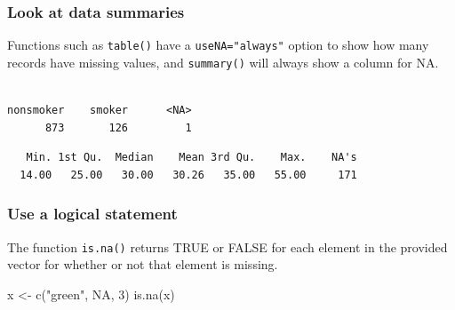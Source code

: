 \documentclass[
  letterpaper,
  DIV=11,
  numbers=noendperiod,
  oneside]{scrreprt}
\newenvironment{Shaded}{\begin{snugshade}}{\end{snugshade}}
\newcommand{\AttributeTok}[1]{\textcolor[rgb]{0.40,0.45,0.13}{#1}}
\newcommand{\ConstantTok}[1]{\textcolor[rgb]{0.56,0.35,0.01}{#1}}
\newcommand{\DecValTok}[1]{\textcolor[rgb]{0.68,0.00,0.00}{#1}}
\newcommand{\FunctionTok}[1]{\textcolor[rgb]{0.28,0.35,0.67}{#1}}
\newcommand{\NormalTok}[1]{\textcolor[rgb]{0.00,0.23,0.31}{#1}}
\newcommand{\OtherTok}[1]{\textcolor[rgb]{0.00,0.23,0.31}{#1}}
\newcommand{\SpecialCharTok}[1]{\textcolor[rgb]{0.37,0.37,0.37}{#1}}
\newcommand{\StringTok}[1]{\textcolor[rgb]{0.13,0.47,0.30}{#1}}
\begin{document}
\subsubsection*{Look at data summaries}\label{look-at-data-summaries}

Functions such as \texttt{table()} have a \texttt{useNA="always"} option
to show how many records have missing values, and \texttt{summary()}
will always show a column for NA.

\begin{Shaded}
\end{Shaded}

\begin{verbatim}

nonsmoker    smoker      <NA> 
      873       126         1 
\end{verbatim}

\begin{Shaded}
\end{Shaded}

\begin{verbatim}
   Min. 1st Qu.  Median    Mean 3rd Qu.    Max.    NA's 
  14.00   25.00   30.00   30.26   35.00   55.00     171 
\end{verbatim}

\subsubsection*{Use a logical statement}\label{use-a-logical-statement}

The function \texttt{is.na()} returns TRUE or FALSE for each element in
the provided vector for whether or not that element is missing.

\begin{Shaded}
\begin{Highlighting}[]
\NormalTok{x }\OtherTok{\textless{}{-}} \FunctionTok{c}\NormalTok{(}\StringTok{"green"}\NormalTok{, }\ConstantTok{NA}\NormalTok{, }\DecValTok{3}\NormalTok{)}
\FunctionTok{is.na}\NormalTok{(x)}
\end{Highlighting}
\end{Shaded}
\end{document}
